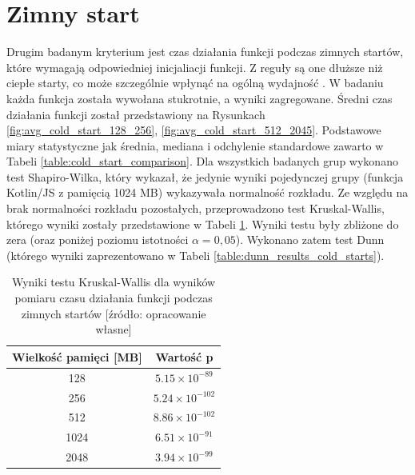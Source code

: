 \section{Zimny start}\label{chapter:results_cold_start}

Drugim badanym kryterium jest czas działania funkcji podczas zimnych startów, które wymagają odpowiedniej inicjaliacji funkcji.
Z reguły są one dłuższe niż ciepłe starty, co może szczególnie wpłynąć na ogólną wydajność \cite{9284261}\cite{8605777}.
W badaniu każda funkcja została wywołana stukrotnie, a wyniki zagregowane.
Średni czas działania funkcji został przedstawiony na Rysunkach \ref{fig:avg_cold_start_128_256}, \ref{fig:avg_cold_start_512_2045}.
Podstawowe miary statystyczne jak średnia, mediana i odchylenie standardowe zawarto w Tabeli \ref{table:cold_start_comparison}.
Dla wszystkich badanych grup wykonano test Shapiro-Wilka, który wykazał, że jedynie wyniki pojedynczej grupy 
(funkcja Kotlin/JS z pamięcią 1024 MB) wykazywała normalność rozkładu.
Ze względu na brak normalności rozkładu pozostałych, przeprowadzono test Kruskal-Wallis, którego wyniki zostały przedstawione w Tabeli \ref{table:kruskal_wallis_test_cold_starts}. 
Wyniki testu były zbliżone do zera (oraz poniżej poziomu istotności $\alpha = 0,05$).
Wykonano zatem test Dunn (którego wyniki zaprezentowano w Tabeli \ref{table:dunn_results_cold_starts}).

\begin{table}[h]
    \centering
    \caption{Wyniki testu Kruskal-Wallis dla wyników pomiaru czasu działania funkcji podczas zimnych startów [źródło: opracowanie własne]}
    \begin{tabular}{|c|c|}
    \hline
    \textbf{Wielkość pamięci [MB]} & \textbf{Wartość p} \\
    \hline
    128 & $5.15 \times 10^{-89}$ \\
    \hline
    256 & $5.24 \times 10^{-102}$ \\
    \hline
    512 & $8.86 \times 10^{-102}$ \\
    \hline
    1024 & $6.51 \times 10^{-91}$ \\
    \hline
    2048 & $3.94 \times 10^{-99}$ \\
    \hline
    \end{tabular}
    \label{table:kruskal_wallis_test_cold_starts}
\end{table}

